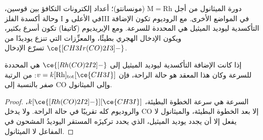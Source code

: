 \begin{omfigure}

{\small دورة  الميثانول من أجل $\mathrm M = \mathrm{Rh}$ (مونسانتو)؛ أعداد إلكترونات
التكافؤ بين قوسين، وحالة أكسدة الفلز I في الأعلى وIII في المواضع الأخرى.
مع الروديوم تكون الإضافة التأكسدية ليوديد الميثيل هي المحددة للسرعة. ومع
الإيريديوم (كاتيفا) تكون أسرع بكثير، ويكون الإدخال الهجري بطيئًا، 
والمعزِّزات التي تنزع يوديدًا من $\ce{[CH3Ir(CO)2I3]-}$ تسرّع الإدخال.}
\end{omfigure}

\begin{proposition}\label{prop:b3:homogeneous-catalysis:monsanto-rate}
إذا كانت الإضافة التأكسدية ليوديد الميثيل إلى $\ce{[Rh(CO)2I2]-}$ هي المحددة للسرعة وكان
هذا المعقد هو حالة الراحة، فإن $v = k[\mathrm{Rh}]_{\mathrm{tot}}[\ce{CH3I}]$: من الرتبة صفر بالنسبة إلى CO وإلى
الميثانول.
\end{proposition}

\begin{proof}
السرعة هي سرعة الخطوة البطيئة، $k[\ce{[Rh(CO)2I2]-}][\ce{CH3I}]$، والروديوم كله تقريبًا
في حالة الراحة. ولا يدخل CO إلا بعد الخطوة البطيئة، والميثانول لا يفعل إلا أن
يجدد يوديد الميثيل، الذي يحدد تركيزَه المستقر اليوديدُ
المشحون في المفاعل لا الميثانول.
\end{proof}

